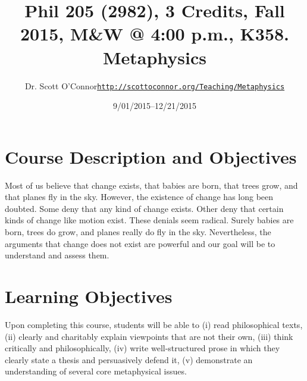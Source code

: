 \documentclass[article,oneside]{memoir}
\makeatletter
\def\myauthor{Author}
\def\mytitle{Title}
\def\mycopyright{\myauthor}
\def\myweb{\href{http://scottoconnor.org/Teaching/Metaphysics}{http://scottoconnor.org/Teaching/Metaphysics}}
\def\myauthor{Dr. Scott O'Connor}
\def\mytitle{{\normalsize Phil 205 (2982), 3 Credits, Fall 2015, M\&W @ 4:00 p.m., K358. \newline} \HUGE Metaphysics}
\makeatother
\begin{document}
\setsansfont[Mapping=tex-text]{Georgia} 
\setmonofont[Mapping=tex-text,Scale=0.8]{Georgia} 

\def\ind{\hangindent=1 true cm\hangafter=1 \noindent}
\def\labelitemi{$\cdot$}

\pagestyle{kjh}

\title{\LARGE\mytitle}     
\author{\Large\myauthor \newline \footnotesize\texttt{\noindent\myweb}}
\date{9/01/2015--12/21/2015}

\published{\,}

\maketitle




%
%

\section{Course Description and Objectives}

Most of us believe that change exists, that babies are born, that trees grow, and that planes fly in the sky. However, the existence of change has long been doubted. Some deny that any kind of change exists. Other deny that certain kinds of change like motion exist. These denials seem radical. Surely babies are born, trees do grow, and planes really do fly in the sky. Nevertheless, the arguments that change does not exist are powerful and our goal will be to understand and assess them. 


\section{Learning Objectives}

Upon completing this course, students will be able to (i) read
philosophical texts, (ii) clearly and charitably explain viewpoints that
are not their own, (iii) think critically and philosophically, (iv)
write well-structured prose in which they clearly state a thesis and
persuasively defend it, (v) demonstrate an understanding of several core
metaphysical issues.
\end{document}
